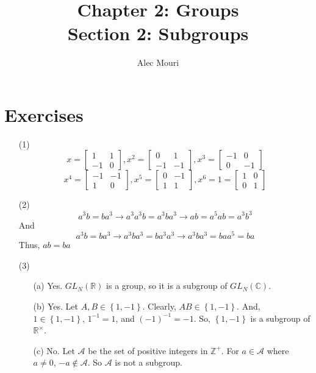 \documentclass[12pt]{article}
\begin{document}
\title{Chapter 2: Groups \\ Section 2: Subgroups}
\author{Alec Mouri}

\maketitle
\section*{Exercises}
\begin{itemize}
\item[(1)]
$$x = \begin{bmatrix}
1 & 1 \\
-1 & 0
\end{bmatrix}, x^2 = \begin{bmatrix}
0 & 1 \\
-1 & -1
\end{bmatrix}, x^3 = \begin{bmatrix}
-1 & 0 \\
0 & -1
\end{bmatrix} $$
$$x^4 = \begin{bmatrix}
-1 & -1 \\
1 & 0
\end{bmatrix}, x^5 = \begin{bmatrix}
0 & -1 \\
1 & 1
\end{bmatrix}, x^6 = 1 = \begin{bmatrix}
1 & 0 \\
0 & 1
\end{bmatrix}$$
\item[(2)]
$$a^3b = ba^3 \rightarrow a^3a^3b = a^3ba^3 \rightarrow ab = a^5ab = a^3b^3$$
And
$$a^3b = ba^3 \rightarrow a^3ba^3 = ba^3a^3 \rightarrow a^3ba^3 = baa^5 = ba$$
Thus, $ab = ba$
\item[(3)]
\begin{itemize}
\item[(a)] Yes. $GL_N(\mathbb{R})$ is a group, so it is a subgroup of $GL_N(\mathbb{C})$.
\item[(b)] Yes. Let $A, B \in \left\lbrace 1, -1 \right\rbrace$. Clearly, $AB \in \left\lbrace 1, -1 \right\rbrace$. And, $1 \in \left\lbrace 1, -1 \right\rbrace$, $1^{-1} = 1$, and $(-1)^{-1} = -1$. So, $\left\lbrace 1, -1 \right\rbrace$ is a subgroup of $\mathbb{R}^\times$.
\item[(c)] No. Let $\mathcal{A}$ be the set of positive integers in $\mathbb{Z}^+$. For $a \in \mathcal{A}$ where $a \neq 0$, $-a \not \in \mathcal{A}$. So $\mathcal{A}$ is not a subgroup.

\end{itemize}
\end{itemize}
\end{document}
